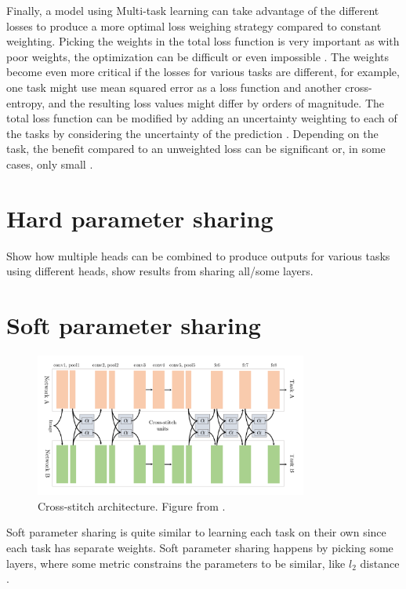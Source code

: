 Finally, a model using Multi-task learning can take advantage of the different losses to produce a more optimal loss weighing strategy compared to constant weighting. 
Picking the weights in the total loss function is very important as with poor weights, the optimization can be difficult or even impossible \citep{lossWeighting}. 
The weights become even more critical if the losses for various tasks are different, for example, one task might use mean squared error as a loss function and another cross-entropy, and the resulting loss values might differ by orders of magnitude.
The total loss function can be modified by adding an uncertainty weighting to each of the tasks by considering the uncertainty of the prediction \citep{usingUncertaintyToWeighLosses}. 
Depending on the task, the benefit compared to an unweighted loss can be significant \citep{usingUncertaintyToWeighLosses} or, in some cases, only small \citep{lossWeighting}.

\section{Hard parameter sharing}
Show how multiple heads can be combined to produce outputs for various tasks using different heads, show results from sharing all/some layers. \citep{visualPerson} \citep{selfDriving} \citep{healthyDrink}

\section{Soft parameter sharing}

\begin{figure}[h!] 
\centering 
\includegraphics[width=0.8\textwidth]{imgs/stitch.png}
\caption{Cross-stitch architecture. Figure from \citep{crossStitch}.\label{fig:params}}
\end{figure}

Soft parameter sharing is quite similar to learning each task on their own since each task has separate weights. Soft parameter sharing happens by picking some layers, where some metric constrains the parameters to be similar, like ${l_2}$ distance \citep{ruderOverview}. 

